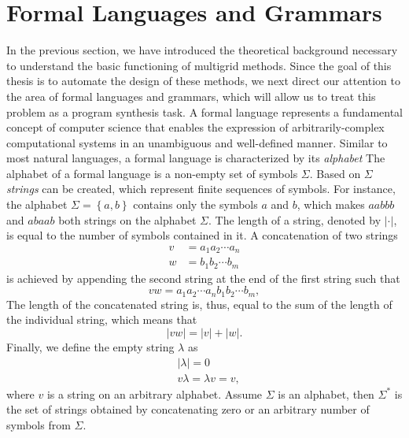 \section{Formal Languages and Grammars}
\label{sec:formal-languages}
In the previous section, we have introduced the theoretical background necessary to understand the basic functioning of multigrid methods.
Since the goal of this thesis is to automate the design of these methods, we next direct our attention to the area of formal languages and grammars, which will allow us to treat this problem as a program synthesis task.
A formal language represents a fundamental concept of computer science that enables the expression of arbitrarily-complex computational systems in an unambiguous and well-defined manner.
Similar to most natural languages, a formal language is characterized by its \emph{alphabet} 
The alphabet of a formal language is a non-empty set of symbols $\Sigma$.
Based on $\Sigma$ \emph{strings} can be created, which represent finite sequences of symbols.
For instance, the alphabet $\Sigma = \left\{a, b\right\}$ contains only the symbols $a$ and $b$, which makes $aabbb$ and $abaab$ both strings on the alphabet $\Sigma$.
The length of a string, denoted by $|\cdot|$, is equal to the number of symbols contained in it. 
A concatenation of two strings 
\begin{equation}
	\begin{split}
		v & = a_1 a_2 \cdots a_n \\
		w & = b_1 b_2 \cdots b_m
	\end{split}
\end{equation}
is achieved by appending the second string at the end of the first string such that
\begin{equation}
	vw = a_1 a_2 \cdots a_n b_1 b_2 \cdots b_m,
\end{equation}
The length of the concatenated string is, thus, equal to the sum of the length of the individual string, which means that
\begin{equation}
|vw| = |v| + |w|.
\end{equation}
Finally, we define the empty string $\lambda$ as
\begin{equation}
	\begin{split}
		& |\lambda| = 0 \\
		& v \lambda = \lambda v = v,
	\end{split}
\end{equation}
where $v$ is a string on an arbitrary alphabet.
Assume $\Sigma$ is an alphabet, then $\Sigma^*$ is the set of strings obtained by concatenating zero or an arbitrary number of symbols from $\Sigma$.
